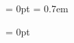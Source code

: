 
\chyph
\parindent = 0pt
\parskip = 0.7em

\overfullrule = 0pt

\def\inspicwcap#1#2#3{
  \label[#2]
  \centerline{\inspic #1 }
  \caption/f #3
}

\let\eng=\it
\let\algo=\it

